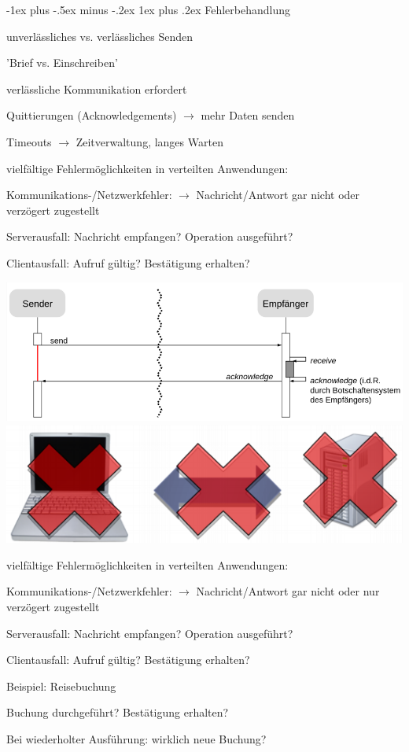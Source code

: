 \documentclass[10pt]{article}
\makeatletter
\renewcommand{\subsubsection}{\@startsection{subsubsection}{3}{0mm}%
                                {-1ex plus -.5ex minus -.2ex}%
                                {1ex plus .2ex}%
                                {\normalfont\small\bfseries}}
\makeatother
\begin{document}
  \subsubsection{Fehlerbehandlung}
  \begin{itemize*}
    \item unverlässliches vs. verlässliches Senden
    \begin{itemize*}
      \item 'Brief vs. Einschreiben'
    \end{itemize*}
    \item verlässliche Kommunikation erfordert
    \begin{itemize*}
      \item Quittierungen (Acknowledgements) $\rightarrow$ mehr Daten senden
      \item Timeouts $\rightarrow$ Zeitverwaltung, langes Warten
    \end{itemize*}
    \item vielfältige Fehlermöglichkeiten in verteilten Anwendungen:
    \begin{itemize*}
      \item Kommunikations-/Netzwerkfehler: $\rightarrow$ Nachricht/Antwort gar nicht oder verzögert zugestellt
      \item Serverausfall: Nachricht empfangen? Operation ausgeführt?
      \item Clientausfall: Aufruf gültig? Bestätigung erhalten?
    \end{itemize*}
  \end{itemize*}
  \begin{center}
    \includegraphics[width=0.4\linewidth]{Assets/Programmierparadigmen-kommunikation-fehler}
    \includegraphics[width=0.4\linewidth]{Assets/Programmierparadigmen-kommunikation-fehler-2}
  \end{center}
  
  vielfältige Fehlermöglichkeiten in verteilten Anwendungen: 
  \begin{itemize*}
    \item Kommunikations-/Netzwerkfehler: $\rightarrow$ Nachricht/Antwort gar nicht oder nur verzögert zugestellt
    \item Serverausfall: Nachricht empfangen? Operation ausgeführt?
    \item Clientausfall: Aufruf gültig? Bestätigung erhalten?
    \item Beispiel: Reisebuchung
    \begin{itemize*}
      \item Buchung durchgeführt? Bestätigung erhalten?
      \item Bei wiederholter Ausführung: wirklich neue Buchung?
    \end{itemize*}
  \end{itemize*}
  
\end{document}
